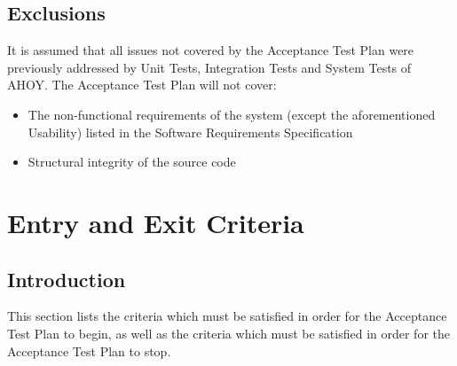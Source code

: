 \documentclass[titlepage]{article}
\begin{document}

\subsection{Exclusions}
    It is assumed that all issues not covered by the Acceptance Test Plan were previously addressed by Unit Tests, Integration Tests and System Tests of AHOY. The Acceptance Test Plan will not cover:
    \begin{itemize}   
        \item The non-functional requirements of the system (except the aforementioned Usability) listed in the Software Requirements Specification
        \item Structural integrity of the source code
    \end{itemize}


\section{Entry and Exit Criteria%
    \label{criteria}%
}


\subsection{Introduction}
    This section lists the criteria which must be satisfied in order for the Acceptance Test Plan to begin, as well as the criteria which must be satisfied in order for the Acceptance Test Plan to stop.

\end{document}
